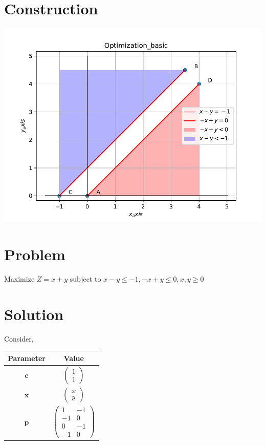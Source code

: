 \documentclass[10pt, a4paper]{article}
\title{\mytitle}
\author{\myauthor\hspace{1em}\\\contact\\FWC22012\hspace{6.5em}IITH\hspace{0.5em}\mymodule\hspace{6em}ASSIGN-8}
\date{}
\newcommand{\myvec}[1]{\ensuremath{\begin{pmatrix}#1\end{pmatrix}}}
\let\vec\mathbf
\begin{document}
	\maketitle
	\tableofcontents

\section{Construction}
\includegraphics[scale=0.5]{fig.pdf}

\section{Problem}
Maximize $Z = x+y$ subject to $x - y \le -1,-x+y\le0 ,x,y \ge 0$
\section{Solution}
Consider,
\begin{tabular}{|c|c|}
	\hline
	\textbf{Parameter}&\textbf{Value}\\
	\hline
	$\vec{c}$ & $\myvec{1\\1}$ \\
	\hline
	$\vec{x}$ & $\myvec{x\\y}$ \\
	\hline
	$\vec{p}$ & $\myvec{1&-1 \\ -1&0 \\ 0&-1 \\ -1&0}$ \\
	\hline
\end{tabular}\\
\end{document}
